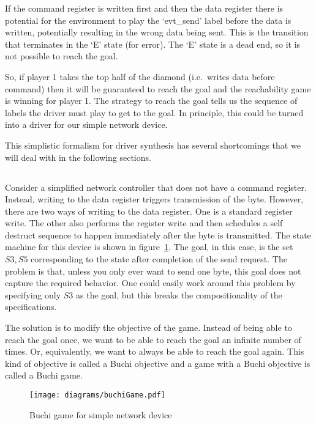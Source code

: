If the command register is written first and then the data register there is potential for the environment to play the `evt\_send' label before the data is written, potentially resulting in the wrong data being sent. This is the transition that terminates in the `E' state (for error). The `E' state is a dead end, so it is not possible to reach the goal. 

So, if player 1 takes the top half of the diamond (i.e.\ writes data before command) then it will be guaranteed to reach the goal and the reachability game is winning for player 1. The strategy to reach the goal tells us the sequence of labels the driver must play to get to the goal. In principle, this could be turned into a driver for our simple network device.

This simplistic formalism for driver synthesis has several shortcomings that we will deal with in the following sections.

\subsection{\buchi}

Consider a simplified network controller that does not have a command register. Instead, writing to the data register triggers transmission of the byte. However, there are two ways of writing to the data register. One is a standard register write. The other also performs the register write and then schedules a self destruct sequence to happen immediately after the byte is transmitted. The state machine for this device is shown in figure~\ref{fig:buchi}. The goal, in this case, is the set ${S3, S5}$ corresponding to the state after completion of the send request. The problem is that, unless you only ever want to send one byte, this goal does not capture the required behavior. One could easily work around this problem by specifying only ${S3}$ as the goal, but this breaks the compositionality of the specifications.

The solution is to modify the objective of the game. Instead of being able to reach the goal once, we want to be able to reach the goal an infinite number of times. Or, equivalently, we want to always be able to reach the goal again. This kind of objective is called a Buchi objective and a game with a Buchi objective is called a Buchi game. 

\begin{figure}
\centering
\texttt{[image: diagrams/buchiGame.pdf]}
\caption{Buchi game for simple network device}
\label{fig:buchi}
\end{figure}

